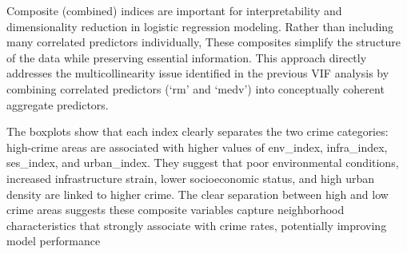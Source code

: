 \documentclass[
]{article}
\begin{document}
Composite (combined) indices are important for interpretability and
dimensionality reduction in logistic regression modeling. Rather than
including many correlated predictors individually, These composites
simplify the structure of the data while preserving essential
information. This approach directly addresses the multicollinearity
issue identified in the previous VIF analysis by combining correlated
predictors (`rm' and `medv') into conceptually coherent aggregate
predictors.

The boxplots show that each index clearly separates the two crime
categories: high-crime areas are associated with higher values of
env\_index, infra\_index, ses\_index, and urban\_index. They suggest
that poor environmental conditions, increased infrastructure strain,
lower socioeconomic status, and high urban density are linked to higher
crime. The clear separation between high and low crime areas suggests
these composite variables capture neighborhood characteristics that
strongly associate with crime rates, potentially improving model
performance
\end{document}
